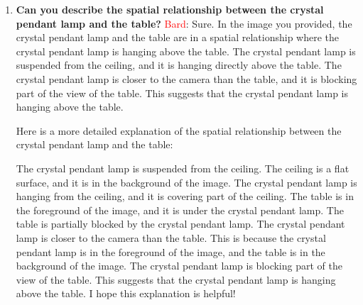 \begin{enumerate}
    \item \textbf{Can you describe the spatial relationship between the crystal pendant lamp and the table?}
    \subitem 
    \textcolor{Red}{Bard}: 
    Sure. In the image you provided, the crystal pendant lamp and the table are in a spatial relationship where the crystal pendant lamp is hanging above the table. The crystal pendant lamp is suspended from the ceiling, and it is hanging directly above the table. The crystal pendant lamp is closer to the camera than the table, and it is blocking part of the view of the table. This suggests that the crystal pendant lamp is hanging above the table.
    
    Here is a more detailed explanation of the spatial relationship between the crystal pendant lamp and the table:
    
    The crystal pendant lamp is suspended from the ceiling. The ceiling is a flat surface, and it is in the background of the image. The crystal pendant lamp is hanging from the ceiling, and it is covering part of the ceiling.
    The table is in the foreground of the image, and it is under the crystal pendant lamp. The table is partially blocked by the crystal pendant lamp.
    The crystal pendant lamp is closer to the camera than the table. This is because the crystal pendant lamp is in the foreground of the image, and the table is in the background of the image.
    The crystal pendant lamp is blocking part of the view of the table. This suggests that the crystal pendant lamp is hanging above the table.
    I hope this explanation is helpful!
    

\end{enumerate}
